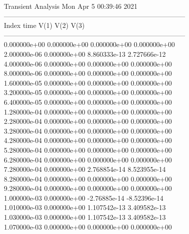                                    Transient Analysis  Mon Apr  5 00:39:46  2021\\ \hline
--------------------------------------------------------------------------------\\ \hline
Index   time            V(1)            V(2)            V(3)            \\ \hline
--------------------------------------------------------------------------------\\ 	0.000000e+00	0.000000e+00	0.000000e+00	0.000000e+00	\\ 	2.000000e-06	0.000000e+00	8.860333e-13	2.727666e-12	\\ 	4.000000e-06	0.000000e+00	0.000000e+00	0.000000e+00	\\ 	8.000000e-06	0.000000e+00	0.000000e+00	0.000000e+00	\\ 	1.600000e-05	0.000000e+00	0.000000e+00	0.000000e+00	\\ 	3.200000e-05	0.000000e+00	0.000000e+00	0.000000e+00	\\ 	6.400000e-05	0.000000e+00	0.000000e+00	0.000000e+00	\\ 	1.280000e-04	0.000000e+00	0.000000e+00	0.000000e+00	\\ 	2.280000e-04	0.000000e+00	0.000000e+00	0.000000e+00	\\ 	3.280000e-04	0.000000e+00	0.000000e+00	0.000000e+00	\\ 	4.280000e-04	0.000000e+00	0.000000e+00	0.000000e+00	\\ 	5.280000e-04	0.000000e+00	0.000000e+00	0.000000e+00	\\ 	6.280000e-04	0.000000e+00	0.000000e+00	0.000000e+00	\\ 	7.280000e-04	0.000000e+00	2.768854e-14	8.523955e-14	\\ 	8.280000e-04	0.000000e+00	0.000000e+00	0.000000e+00	\\ 	9.280000e-04	0.000000e+00	0.000000e+00	0.000000e+00	\\ 	1.000000e-03	0.000000e+00	-2.76885e-14	-8.52396e-14	\\ 	1.010000e-03	0.000000e+00	1.107542e-13	3.409582e-13	\\ 	1.030000e-03	0.000000e+00	1.107542e-13	3.409582e-13	\\ 	1.070000e-03	0.000000e+00	0.000000e+00	0.000000e+00	\\ \hline
